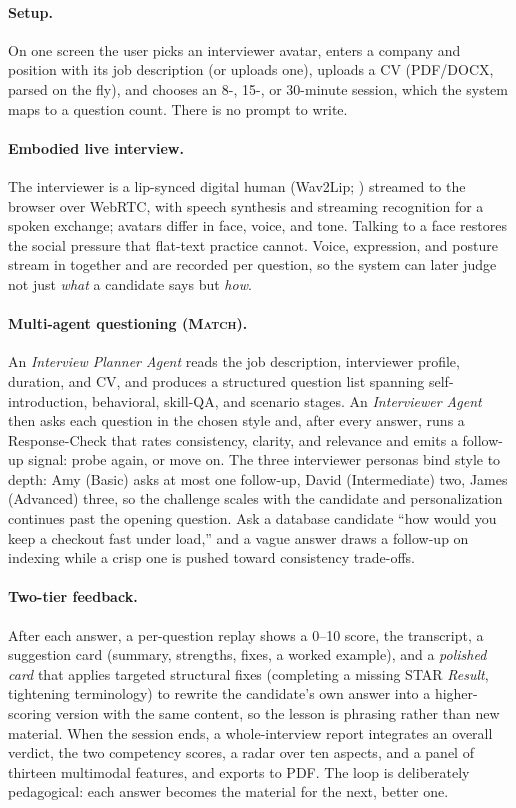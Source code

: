 \documentclass[11pt]{article}
\begin{document}
\paragraph{Setup.} On one screen the user picks an interviewer avatar, enters a company and position with its job description (or uploads one), uploads a CV (PDF/DOCX, parsed on the fly), and chooses an 8-, 15-, or 30-minute session, which the system maps to a question count. There is no prompt to write.

\paragraph{Embodied live interview.} The interviewer is a lip-synced digital human (Wav2Lip; \citealp{prajwal2020wav2lip}) streamed to the browser over WebRTC, with speech synthesis and streaming recognition for a spoken exchange; avatars differ in face, voice, and tone. Talking to a face restores the social pressure that flat-text practice cannot. Voice, expression, and posture stream in together and are recorded per question, so the system can later judge not just \emph{what} a candidate says but \emph{how}.

\paragraph{Multi-agent questioning (\textsc{Match}).} An \emph{Interview Planner Agent} reads the job description, interviewer profile, duration, and CV, and produces a structured question list spanning self-introduction, behavioral, skill-QA, and scenario stages. An \emph{Interviewer Agent} then asks each question in the chosen style and, after every answer, runs a Response-Check that rates consistency, clarity, and relevance and emits a follow-up signal: probe again, or move on. The three interviewer personas bind style to depth: Amy (Basic) asks at most one follow-up, David (Intermediate) two, James (Advanced) three, so the challenge scales with the candidate and personalization continues past the opening question. Ask a database candidate ``how would you keep a checkout fast under load,'' and a vague answer draws a follow-up on indexing while a crisp one is pushed toward consistency trade-offs.

\paragraph{Two-tier feedback.} After each answer, a per-question replay shows a 0--10 score, the transcript, a suggestion card (summary, strengths, fixes, a worked example), and a \emph{polished card} that applies targeted structural fixes (completing a missing STAR \emph{Result}, tightening terminology) to rewrite the candidate's own answer into a higher-scoring version with the same content, so the lesson is phrasing rather than new material. When the session ends, a whole-interview report integrates an overall verdict, the two competency scores, a radar over ten aspects, and a panel of thirteen multimodal features, and exports to PDF. The loop is deliberately pedagogical: each answer becomes the material for the next, better one.
\end{document}
